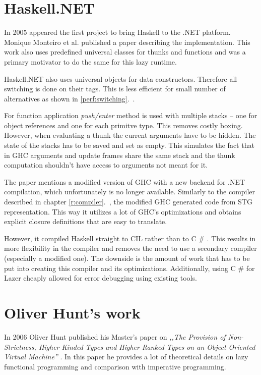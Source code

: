 \documentclass[en]{pracamgr}
\newcommand{\shrp}{%
  {\fontfamily{ppl}\selectfont\#%
  }}
\newcommand{\myref}[1]{\ref{#1}.~\textit{\nameref{#1}}}
\begin{document}
\section{Haskell.NET}

In 2005 appeared the first project to bring Haskell
to the .NET platform.
Monique Monteiro et al. published a paper \cite{Brazil}
describing the implementation. This work also
uses predefined universal classes for thunks and functions and was
a primary motivator to do the same for this lazy runtime.

Haskell.NET also uses universal objects for data constructors.
Therefore all switching is done on their tags. This
is less efficient for small number of alternatives as shown
in \myref{perf:switching}.

For function application \textit{push/enter} method is used
with multiple stacks -- one for object references and
one for each primitve type. This removes costly boxing.
However, when evaluating a thunk
the current arguments have to be hidden.
The state of the stacks has to be saved and set as empty.
This simulates the fact that in GHC arguments and update frames share
the same stack and the thunk computation shouldn't have access to arguments
not meant for it.

The paper mentions a modified version of GHC
with a new backend for .NET compilation, which
unfortunately is no longer available.
Similarly to the compiler described in chapter \myref{r:compiler},
the modified GHC generated code from STG representation.
This way it utilizes a lot of GHC's optimizations and obtains
explicit closure definitions that are easy to translate.

However, it compiled Haskell straight to CIL rather than to C\shrp{}.
This results in more flexibility in the compiler and removes the
need to use a secondary compiler (especially a modified one).
The downside is the amount of work that has to be put into
creating this compiler and its optimizations.
Additionally, using C\shrp{} for Lazer cheaply allowed for error debugging
using existing tools.

\section{Oliver Hunt's work}

In 2006 Oliver Hunt published his Master's paper
on \textit{,,The Provision of Non-Strictness, Higher Kinded Types
and Higher Ranked Types on an Object Oriented
Virtual Machine''} \cite{Hunt}.
In this paper he provides a lot of theoretical details
on lazy functional programming and comparison with imperative programming.
\end{document}
